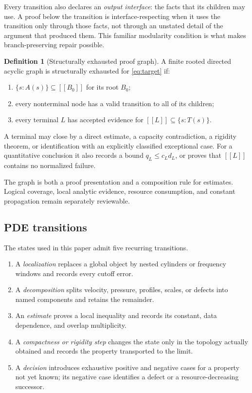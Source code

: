 \documentclass[11pt,reqno]{amsart}
\theoremstyle{plain}
\theoremstyle{definition}
\newtheorem{definition}[definition]{Definition}
\theoremstyle{remark}
\numberwithin{equation}{section}
\newcommand{\sem}[1]{[\![#1]\!]}
\begin{document}
Every transition also declares an \emph{output interface}: the facts that its
children may use.  A proof below the transition is interface-respecting when
it uses the transition only through those facts, not through an unstated detail
of the argument that produced them.  This familiar modularity condition is
what makes branch-preserving repair possible.

\begin{definition}[Structurally exhausted proof graph]\label{def:closed-graph}
A finite rooted directed acyclic graph is structurally exhausted for
\eqref{eq:target} if:
\begin{enumerate}
  \item \(\{s:A(s)\}\subseteq\sem{B_0}\) for its root \(B_0\);
  \item every nonterminal node has a valid transition to all of its children;
  \item every terminal \(L\) has accepted evidence for
  \(\sem L\subseteq\{s:T(s)\}\).
\end{enumerate}
A terminal may close by a direct estimate, a capacity contradiction, a
rigidity theorem, or identification with an explicitly classified exceptional
case.  For a quantitative conclusion it also records a bound
\(q_L\le c_Ld_L\), or proves that \(\sem L\) contains no normalized failure.
\end{definition}

The graph is both a proof presentation and a composition rule for estimates.
Logical coverage, local analytic evidence, resource consumption, and constant
propagation remain separately reviewable.

\subsection{PDE transitions}

The states used in this paper admit five recurring transitions.

\begin{enumerate}
  \item A \emph{localization} replaces a global object by nested cylinders or
  frequency windows and records every cutoff error.
  \item A \emph{decomposition} splits velocity, pressure, profiles, scales, or
  defects into named components and retains the remainder.
  \item An \emph{estimate} proves a local inequality and records its constant,
  data dependence, and overlap multiplicity.
  \item A \emph{compactness or rigidity step} changes the state only in the
  topology actually obtained and records the property transported to the
  limit.
  \item A \emph{decision} introduces exhaustive positive and negative cases
  for a property not yet known; its negative case identifies a defect or a
  resource-decreasing successor.
\end{enumerate}
\end{document}
